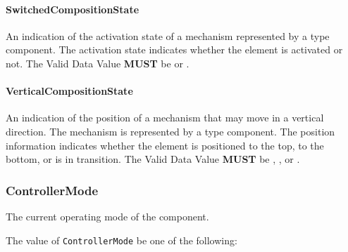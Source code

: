 \paragraph{SwitchedCompositionState}\mbox{}
\label{sec:SwitchedCompositionState}



An indication of the activation state of a mechanism represented by a  type component.
 The activation state indicates whether the  element is activated or not.
 The \gls{Valid Data Value} \textbf{MUST} be  or .


\paragraph{VerticalCompositionState}\mbox{}
\label{sec:VerticalCompositionState}



An indication of the position of a mechanism that may move in a vertical direction. The mechanism is represented by a  type component. 
 The position information indicates whether the  element is positioned to the top, to the bottom, or is in transition.  
 The \gls{Valid Data Value} \textbf{MUST} be , , or .


\subsubsection{ControllerMode}
\label{sec:ControllerMode}



The current operating mode of the  component.


The value of \texttt{ControllerMode} \MUST be one of the following: 


